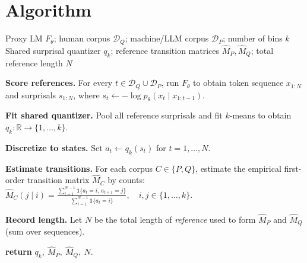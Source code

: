 \documentclass{article}
\theoremstyle{plain}
\theoremstyle{definition}
\theoremstyle{remark}
\begin{document}
\section{Algorithm}\label{sec:alg}
\begin{algorithm}[h]
\caption{SurpMark (Offline): Build Human/Machine Reference Transitions}
\label{alg:surpmark-offline}
\begin{algorithmic}[1]
\REQUIRE Proxy LM $F_\theta$; human corpus $\mathcal{D}_Q$; machine/LLM corpus $\mathcal{D}_P$; number of bins $k$
\ENSURE Shared surprisal quantizer $q_k$; reference transition matrices $\hat M_P, \hat M_Q$; total reference length $N$

\STATE \textbf{Score references.}
For every $t \in \mathcal{D}_Q \cup \mathcal{D}_P$, run $F_\theta$ to obtain token sequence $x_{1:N}$ and surprisals $s_{1:N}$, where
$s_t \leftarrow -\log p_\theta(x_t\mid x_{1:t-1})$.

\STATE \textbf{Fit shared quantizer.}
Pool all reference surprisals and fit $k$-means to obtain $q_k:\mathbb{R}\to\{1,\dots,k\}$.

\STATE \textbf{Discretize to states.}
Set $a_t \leftarrow q_k(s_t)$ for $t=1,\dots,N$.

\STATE \textbf{Estimate transitions.}
For each corpus $C\in\{P,Q\}$, estimate the empirical first-order transition matrix $\hat M_C$ by counts:
\STATE \quad $\displaystyle
\hat M_C(j\mid i)=\frac{\sum_{t=1}^{N-1}\mathbf{1}\{a_t=i,\,a_{t+1}=j\}}{\sum_{t=1}^{N-1}\mathbf{1}\{a_t=i\}},\quad i,j\in\{1,\dots,k\}.
$

\STATE \textbf{Record length.}
Let $N$ be the total length of \emph{reference} used to form $\hat M_P$ and $\hat M_Q$ (sum over sequences).

\STATE \textbf{return} $q_k,\ \hat M_P,\ \hat M_Q,\ N$.
\end{algorithmic}
\end{algorithm}
\end{document}
